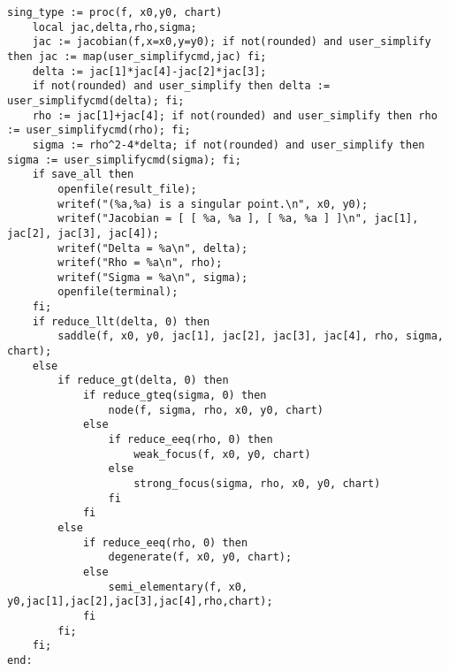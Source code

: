 \documentclass[a4paper,10pt]{article}
\begin{document}
\begin{lstlisting}[name=type]
sing_type := proc(f, x0,y0, chart)
    local jac,delta,rho,sigma;
    jac := jacobian(f,x=x0,y=y0); if not(rounded) and user_simplify then jac := map(user_simplifycmd,jac) fi;
    delta := jac[1]*jac[4]-jac[2]*jac[3];
    if not(rounded) and user_simplify then delta := user_simplifycmd(delta); fi;
    rho := jac[1]+jac[4]; if not(rounded) and user_simplify then rho := user_simplifycmd(rho); fi;
    sigma := rho^2-4*delta; if not(rounded) and user_simplify then sigma := user_simplifycmd(sigma); fi;
    if save_all then
        openfile(result_file);
        writef("(%a,%a) is a singular point.\n", x0, y0);
        writef("Jacobian = [ [ %a, %a ], [ %a, %a ] ]\n", jac[1], jac[2], jac[3], jac[4]);
        writef("Delta = %a\n", delta);
        writef("Rho = %a\n", rho);
        writef("Sigma = %a\n", sigma);
        openfile(terminal);
    fi;
    if reduce_llt(delta, 0) then
        saddle(f, x0, y0, jac[1], jac[2], jac[3], jac[4], rho, sigma, chart);
    else
        if reduce_gt(delta, 0) then
            if reduce_gteq(sigma, 0) then
                node(f, sigma, rho, x0, y0, chart)
            else
                if reduce_eeq(rho, 0) then
                    weak_focus(f, x0, y0, chart)
                else
                    strong_focus(sigma, rho, x0, y0, chart)
                fi
            fi
        else
            if reduce_eeq(rho, 0) then
                degenerate(f, x0, y0, chart);
            else
                semi_elementary(f, x0, y0,jac[1],jac[2],jac[3],jac[4],rho,chart);
            fi
        fi;
    fi;
end:
\end{lstlisting}
\end{document}
